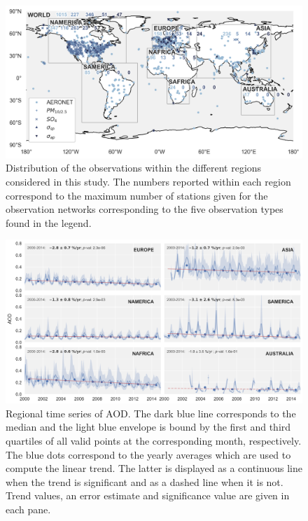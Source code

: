 \documentclass[acp, manuscript]{copernicus}
\begin{document}
\clearpage
\begin{figure}
 \includegraphics[width=12cm]{../scripts/figs/maps/av_obs.png}
 \caption{Distribution of the observations within the different regions considered in this study. The numbers reported within each region correspond to the maximum number of stations given for the observation networks corresponding to the five observation types found in the legend.}
 \label{fig:map_obs}
\end{figure}

\clearpage
\begin{figure}
 \includegraphics[width=16cm]{../scripts/figs/ts/panel-od550aer.png}
 \caption{Regional time series of AOD. The dark blue line corresponds to the median and the light blue envelope is bound by the first and third quartiles of all valid points at the corresponding month, respectively. The blue dots correspond to the yearly averages which are used to compute the linear trend. The latter is displayed as a continuous line when the trend is significant and as a dashed line when it is not. Trend values, an error estimate and significance value are given in each pane.}
 \label{fig:ts_aod}
\end{figure}
\end{document}
